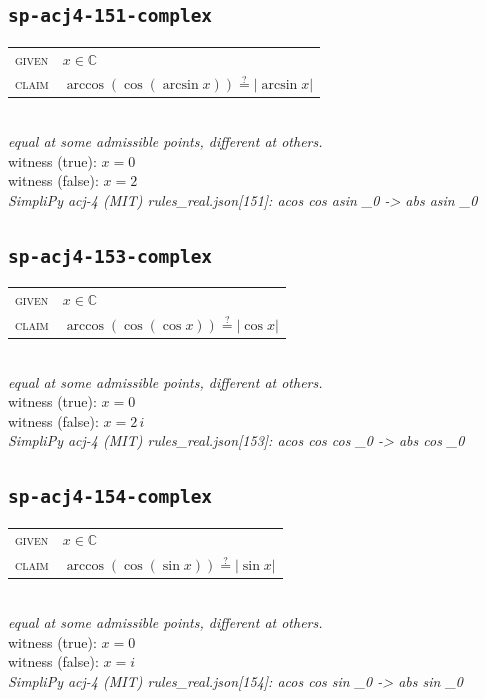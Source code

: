 \documentclass[11pt]{article}
\begin{document}
\subsection*{\texttt{sp-acj4-151-complex}}
\begin{tabular}{@{}l@{\quad}l@{}}
\textsc{given} & $x \in \mathbb{C}$ \\[4pt]
\textsc{claim} & $\displaystyle \arccos\left(\cos\left(\arcsin x\right)\right) \overset{?}{=} \left|\arcsin x\right|$ \\
\end{tabular}\\[2pt]
{\small\emph{equal at some admissible points, different at others.}}\\
{\footnotesize\color{gray}witness (true): $x = 0$}\\
{\footnotesize\color{gray}witness (false): $x = 2$}\\
\emph{SimpliPy acj-4 (MIT) rules\_real.json[151]: acos cos asin \_0  ->  abs asin \_0}\\

\subsection*{\texttt{sp-acj4-153-complex}}
\begin{tabular}{@{}l@{\quad}l@{}}
\textsc{given} & $x \in \mathbb{C}$ \\[4pt]
\textsc{claim} & $\displaystyle \arccos\left(\cos\left(\cos x\right)\right) \overset{?}{=} \left|\cos x\right|$ \\
\end{tabular}\\[2pt]
{\small\emph{equal at some admissible points, different at others.}}\\
{\footnotesize\color{gray}witness (true): $x = 0$}\\
{\footnotesize\color{gray}witness (false): $x = 2 \, i$}\\
\emph{SimpliPy acj-4 (MIT) rules\_real.json[153]: acos cos cos \_0  ->  abs cos \_0}\\

\subsection*{\texttt{sp-acj4-154-complex}}
\begin{tabular}{@{}l@{\quad}l@{}}
\textsc{given} & $x \in \mathbb{C}$ \\[4pt]
\textsc{claim} & $\displaystyle \arccos\left(\cos\left(\sin x\right)\right) \overset{?}{=} \left|\sin x\right|$ \\
\end{tabular}\\[2pt]
{\small\emph{equal at some admissible points, different at others.}}\\
{\footnotesize\color{gray}witness (true): $x = 0$}\\
{\footnotesize\color{gray}witness (false): $x = i$}\\
\emph{SimpliPy acj-4 (MIT) rules\_real.json[154]: acos cos sin \_0  ->  abs sin \_0}\\
\end{document}

